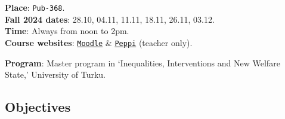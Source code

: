 \documentclass[letterpaper]{article}
\begin{document}
{\bf Place}: \texttt{Pub-368}.\\
{\bf Fall 2024 dates}: 28.10, 04.11, 11.11, 18.11, 26.11, 03.12.\\
{\bf Time}: Always from noon to 2pm.\\

{\bf Course websites}: \href{https://moodle.utu.fi/course/view.php?id=33451}{\texttt{Moodle}} \& \href{https://planner.peppi.utu.fi/group/suunnittelijan-tyopoyta/toteutusten-hallinta?p_p_id=RealizationPortlet_WAR_realizationportlet&p_p_lifecycle=0&p_p_state=normal&p_p_mode=view&_RealizationPortlet_WAR_realizationportlet_struts.portlet.action=%2Frealization%2Fbasic&realization.realizationId=45184}{\texttt{Peppi}} (teacher only).




{\bf Program}: Master program in `Inequalities, Interventions and New Welfare State,' University of Turku.%





\subsection*{Objectives}

\end{document}
